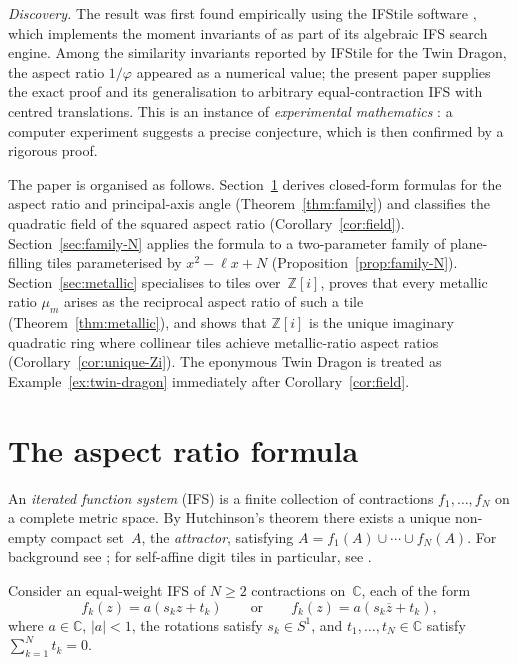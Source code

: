 \documentclass{amsart}
\theoremstyle{definition}
\theoremstyle{remark}
\begin{document}
\textit{Discovery.}
The result was first found empirically using the IFStile software
\cite{Mekhontsev2019}, which implements the moment invariants of
\cite{VrscayRoehrig1989,Vrscay1991} as part of its algebraic IFS search engine.
Among the similarity invariants reported by IFStile for the Twin Dragon, the
aspect ratio $1/\varphi$ appeared as a numerical value; the present paper supplies
the exact proof and its generalisation to arbitrary
equal-contraction IFS with centred translations.
This is an instance of \emph{experimental mathematics} \cite{BorweinBailey2004}:
a computer experiment suggests a precise conjecture, which is then confirmed
by a rigorous proof.

The paper is organised as follows.
Section~\ref{sec:family} derives closed-form formulas for the
aspect ratio and principal-axis angle
(Theorem~\ref{thm:family}) and classifies the quadratic field
of the squared aspect ratio (Corollary~\ref{cor:field}).
Section~\ref{sec:family-N} applies the formula to a two-parameter family of
plane-filling tiles parameterised by $x^2-\ell x+N$
(Proposition~\ref{prop:family-N}).
Section~\ref{sec:metallic} specialises to tiles over~$\mathbb{Z}[i]$,
proves that every metallic ratio $\mu_m$ arises as
the reciprocal aspect ratio of such a tile
(Theorem~\ref{thm:metallic}), and shows that $\mathbb{Z}[i]$ is the unique imaginary
quadratic ring where collinear tiles achieve metallic-ratio aspect ratios
(Corollary~\ref{cor:unique-Zi}).
The eponymous Twin Dragon is treated as Example~\ref{ex:twin-dragon}
immediately after Corollary~\ref{cor:field}.

\section{The aspect ratio formula}\label{sec:family}

An \emph{iterated function system} (IFS) is a finite collection
of contractions $f_1,\ldots,f_N$ on a complete metric space.
By Hutchinson's theorem \cite{Hutchinson1981} there exists a unique
non-empty compact set~$A$, the \emph{attractor}, satisfying
$A = f_1(A) \cup \cdots \cup f_N(A)$.
For background see \cite{Barnsley1993, Falconer2014}; for self-affine digit tiles
in particular, see \cite{Bandt1991, Kenyon1992, LagariasWang1996}.

Consider an equal-weight IFS of $N\geq 2$ contractions on~$\mathbb{C}$,
each of the form
\[
  f_k(z) = a(s_k z + t_k)
  \qquad\text{or}\qquad
  f_k(z) = a(s_k\overline{z} + t_k),
\]
where $a \in \mathbb{C}$, $|a| < 1$, the rotations satisfy
$s_k \in S^1$, and $t_1,\ldots,t_N \in \mathbb{C}$ satisfy
$\sum_{k=1}^N t_k = 0$.
\end{document}
